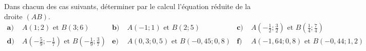 \documentclass[11pt]{article}
\begin{document}
\begin{exo}
  Dans chacun des cas suivants, déterminer par le calcul l'équation réduite de
  la droite $\left( AB \right)$.
  \begin{align*}
    \textbf{a)}\;& A\left( 1; 2\right)\text{ et }B\left(
    3; 6\right) &
    \textbf{b)}\;& A\left( -1; 1\right)\text{ et }B\left(
    2; 5\right) &
    \textbf{c)}\;& A\left( -\frac{1}{2}; \frac{3}{2} \right)\text{ et }B\left(
    \frac{1}{4}; \frac{7}{4} \right) \\
    \textbf{d)}\;& A\left( -\frac{5}{9}; -\frac{1}{7} \right)\text{ et }B\left(
    -\frac{1}{9}; \frac{3}{7} \right) &
    \textbf{e)}\;& A\left( 0,3; 0,5 \right)\text{ et }B\left(
    -0,45 ; 0,8 \right) &
    \textbf{f)}\;& A\left( -1,64; 0,8\right)\text{ et }B\left(
    -0,44; 1,2 \right)
  \end{align*}
\end{exo}
\end{document}
